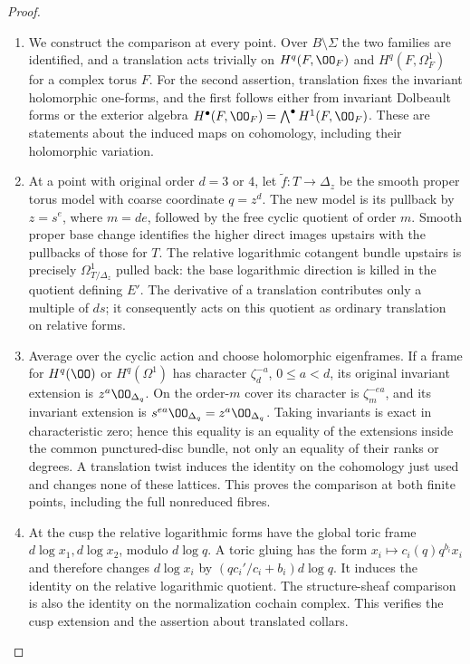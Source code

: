 \begin{proof}
\begin{enumerate}[label=\arabic*.,leftmargin=*]
\item We construct the comparison at every point. Over $B\setminus\Sigma$
the two families are identified, and a translation acts trivially on
$H^q(F,\OO_F)$ and $H^q(F,\Omega^1_F)$ for a complex torus $F$.
For the second assertion, translation fixes the invariant holomorphic
one-forms, and the first follows either from invariant Dolbeault forms
or the exterior algebra $H^\bullet(F,\OO_F)=\bigwedge^\bullet H^1(F,\OO_F)$.
These are statements about the induced maps on cohomology, including
their holomorphic variation.

\item At a point with original order $d=3$ or $4$, let
$\widetilde f:T\to\Delta_z$ be the smooth proper torus model with
coarse coordinate $q=z^d$. The new model is its pullback by $z=s^e$,
where $m=de$, followed by the free cyclic quotient of order $m$.
Smooth proper base change identifies the higher direct images upstairs
with the pullbacks of those for $T$. The relative logarithmic cotangent
bundle upstairs is precisely $\Omega^1_{T/\Delta_z}$ pulled back:
the base logarithmic direction is killed in the quotient defining $E'$.
The derivative of a translation contributes only a multiple of $ds$;
it consequently acts on this quotient as ordinary translation on relative forms.

\item Average over the cyclic action and choose holomorphic eigenframes.
If a frame for $H^q(\OO)$ or $H^q(\Omega^1)$ has character
$\zeta_d^{-a}$, $0\le a<d$, its original invariant extension is
$z^a\OO_{\Delta_q}$. On the order-$m$ cover its character is
$\zeta_m^{-ea}$, and its invariant extension is
$s^{ea}\OO_{\Delta_q}=z^a\OO_{\Delta_q}$.
Taking invariants is exact in characteristic zero; hence this equality
is an equality of the extensions inside the common punctured-disc
bundle, not only an equality of their ranks or degrees. A translation
twist induces the identity on the cohomology just used and changes none
of these lattices. This proves the comparison at both finite points,
including the full nonreduced fibres.

\item At the cusp the relative logarithmic forms have the global toric frame
$d\log x_1,d\log x_2$, modulo $d\log q$.
A toric gluing has the form
$x_i\mapsto c_i(q)q^{b_i}x_i$ and therefore changes $d\log x_i$ by
$(q c_i'/c_i+b_i)d\log q$. It induces the identity on the relative
logarithmic quotient. The structure-sheaf comparison is also the identity
on the normalization cochain complex. This verifies the cusp extension
and the assertion about translated collars.


\end{enumerate}
\end{proof}
